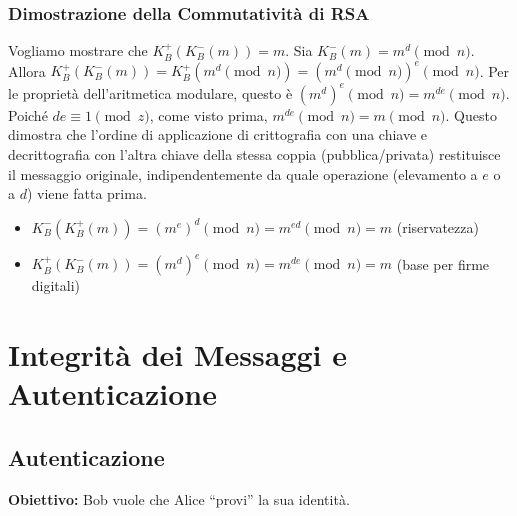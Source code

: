 \subsubsection{Dimostrazione della Commutatività di RSA}
\label{ssubsec:comm_rsa_proof}
Vogliamo mostrare che $K_B^+(K_B^-(m)) = m$.
Sia $K_B^-(m) = m^d \pmod n$.
Allora $K_B^+(K_B^-(m)) = K_B^+(m^d \pmod n) = (m^d \pmod n)^e \pmod n$.
Per le proprietà dell'aritmetica modulare, questo è $ (m^d)^e \pmod n = m^{de} \pmod n$.
Poiché $de \equiv 1 \pmod z$, come visto prima, $m^{de} \pmod n = m \pmod n$.
Questo dimostra che l'ordine di applicazione di crittografia con una chiave e decrittografia con l'altra chiave della stessa coppia (pubblica/privata) restituisce il messaggio originale, indipendentemente da quale operazione (elevamento a $e$ o a $d$) viene fatta prima.
\begin{itemize}
    \item $K_B^-(K_B^+(m)) = (m^e)^d \pmod n = m^{ed} \pmod n = m$ (riservatezza)
    \item $K_B^+(K_B^-(m)) = (m^d)^e \pmod n = m^{de} \pmod n = m$ (base per firme digitali)
\end{itemize}

\section{Integrità dei Messaggi e Autenticazione}
\label{sec:integrita_autenticazione}

\subsection{Autenticazione}
\textbf{Obiettivo:} Bob vuole che Alice \textquotedblleft provi\textquotedblright{} la sua identità.

